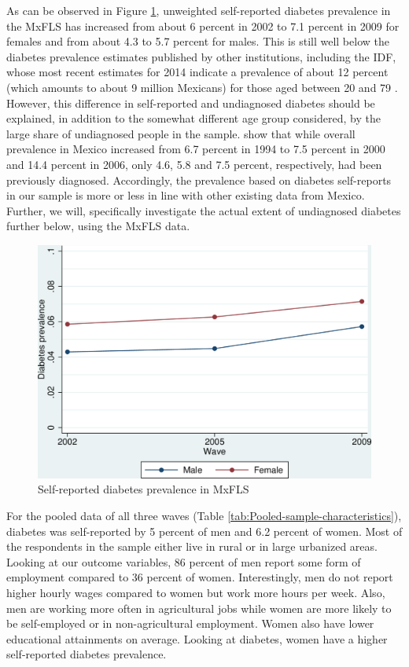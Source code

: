 \documentclass[12pt,english,british]{article}
\begin{document}
As can be observed in Figure \ref{fig:Self-reported-diabetes-prevalenc},
unweighted self-reported diabetes prevalence in the \ac{MxFLS}
has increased from about 6 percent in 2002 to 7.1 percent in 2009
for females and from about 4.3 to 5.7 percent for males. This is
still well below the diabetes prevalence estimates published by other
institutions, including the \ac{IDF}, whose most recent estimates for 2014 indicate a prevalence of about 12 percent (which amounts to about 9 million Mexicans) for those aged between 20 and 79 \citep{InternationalDiabetesFederation2013}.
However, this difference in self-reported and undiagnosed diabetes should be explained, in addition to the somewhat different age group considered, by the large share of undiagnosed people in the sample. \citet{Barquera2013} show that while overall prevalence in Mexico increased from 6.7 percent in 1994 to 7.5 percent in 2000 and 14.4 percent in 2006, only 4.6, 5.8 and 7.5 percent, respectively, had been previously diagnosed. Accordingly, the prevalence based on diabetes self-reports in our sample is more or less in line with other existing data from Mexico. Further, we will, specifically investigate the actual extent of undiagnosed diabetes further below, using the \ac{MxFLS} data.

\begin{figure}[h!]
\begin{center}
\includegraphics[width=0.7\columnwidth]{figures/diabetes_prevalence1/diabetes_prevalence1}
\end{center}
\caption{\label{fig:Self-reported-diabetes-prevalenc}Self-reported diabetes
prevalence in MxFLS}
\end{figure}

For the pooled data of all three waves (Table \ref{tab:Pooled-sample-characteristics}),
diabetes was self-reported by 5 percent of men and 6.2 percent of
women. Most of the respondents in the sample either live in rural
or in large urbanized areas. Looking at our outcome variables, 86
percent of men report some form of employment compared to 36 percent
of women. Interestingly, men do not report higher hourly wages compared
to women but work more hours per week. Also, men are working more
often in agricultural jobs while women are more likely to be self-employed
or in non-agricultural employment. Women also have lower educational
attainments on average. Looking at diabetes, women have a higher self-reported
diabetes prevalence. 
\end{document}
